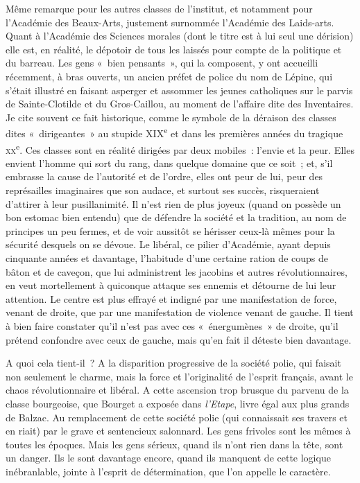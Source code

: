 \documentclass[french,twoside]{book} %
\begin{document}
Même remarque pour les autres classes de l’institut, et notamment pour l’Académie des Beaux-Arts, justement surnommée l’Académie des Laids-arts. Quant à l’Académie des Sciences morales (dont le titre est à lui seul une dérision) elle est, en réalité, le dépotoir de tous les laissés pour compte de la politique et du barreau. Les gens « bien pensants », qui la composent, y ont accueilli récemment, à bras ouverts, un ancien préfet de police du nom de Lépine, qui s’était illustré en faisant asperger et assommer les jeunes catholiques sur le parvis de Sainte-Clotilde et du Gros-Caillou, au moment de l’affaire dite des Inventaires. Je cite souvent ce fait historique, comme le symbole de la déraison des classes dites « dirigeantes » au stupide XIX\textsuperscript{e} et dans les premières années du tragique \textsc{xx}\textsuperscript{e}. Ces classes sont en réalité dirigées par deux mobiles : l’envie et la peur. Elles envient l’homme qui sort du rang, dans quelque domaine que ce soit ; et, s’il embrasse la cause de l’autorité et de l’ordre, elles ont peur de lui, peur des représailles imaginaires que son audace, et surtout ses succès, risqueraient d’attirer à leur pusillanimité. Il n’est rien de plus joyeux (quand on possède un bon estomac bien entendu) que de défendre la société et la tradition, au nom de principes un peu fermes, et de voir aussitôt se hérisser ceux-là mêmes pour la sécurité desquels on se dévoue. Le libéral, ce pilier d’Académie, ayant depuis cinquante années et davantage, l’habitude d’une certaine ration de coups de bâton et de caveçon, que lui administrent les jacobins et autres révolutionnaires, en veut mortellement à quiconque attaque ses ennemis et détourne de lui leur attention. Le centre est plus effrayé et indigné par une manifestation de force, venant de droite, que par une manifestation de violence venant de gauche. Il tient à bien faire constater qu’il n’est pas avec ces « énergumènes » de droite, qu’il prétend confondre avec ceux de gauche, mais qu’en fait il déteste bien davantage.\par
A quoi cela tient-il ? A la disparition progressive de la société polie, qui faisait non seulement le charme, mais la force et l’originalité de l’esprit français, avant le chaos révolutionnaire et libéral. A cette ascension trop brusque du parvenu de la classe bourgeoise, que Bourget a exposée dans {\itshape l’Etape}, livre égal aux plus grands de Balzac. Au remplacement de cette société polie (qui connaissait ses travers et en riait) par le grave et sentencieux salonnard. Les gens frivoles sont les mêmes à toutes les époques. Mais les gens sérieux, quand ils n’ont rien dans la tête, sont un danger. Ils le sont davantage encore, quand ils manquent de cette logique inébranlable, jointe à l’esprit de détermination, que l’on appelle le caractère.\par
\end{document}
